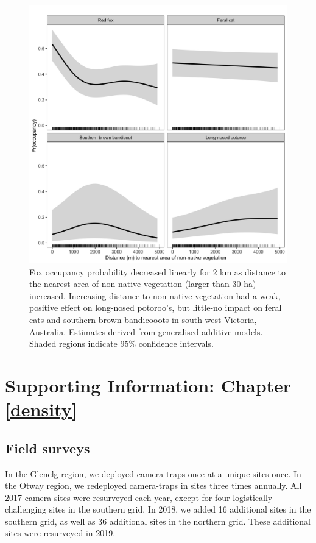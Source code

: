 \documentclass[11pt,a4paper,titlepage,twoside,openright]{style/unimelbthesis}
\begin{document}
\begin{mainmatter}
\begin{figure}
{\centering \includegraphics[width=1\linewidth]{figure/dist_edge} 

}

\caption{Fox occupancy probability decreased linearly for 2 km as distance to the nearest area of non-native vegetation (larger than 30 ha) increased. Increasing distance to non-native vegetation had a weak, positive effect on long-nosed potoroo's, but little-no impact on feral cats and southern brown bandicooots in south-west Victoria, Australia. Estimates derived from generalised additive models. Shaded regions indicate 95\% confidence intervals.}\label{fig:occ-dist}
\end{figure}
\hypertarget{density-app}{%
\chapter{Supporting Information: Chapter \ref{density}}\label{density-app}}

\newpage

\hypertarget{density-app-field}{%
\section{Field surveys}\label{density-app-field}}

In the Glenelg region, we deployed camera-traps once at a unique sites once. In the Otway region, we redeployed camera-traps in sites three times annually. All 2017 camera-sites were resurveyed each year, except for four logistically challenging sites in the southern grid. In 2018, we added 16 additional sites in the southern grid, as well as 36 additional sites in the northern grid. These additional sites were resurveyed in 2019.


\end{mainmatter}
\end{document}
